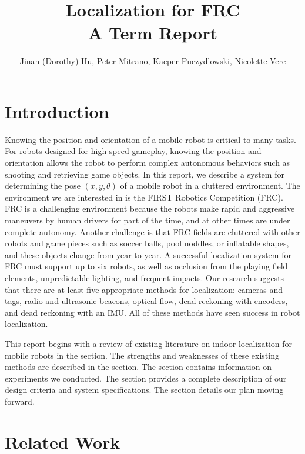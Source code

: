 \documentclass{article}
\begin{document}
\title{Localization for FRC \\
  \large{A Term Report}
  }
\author{Jinan (Dorothy) Hu, Peter Mitrano, Kacper Puczydlowski, Nicolette Vere}

\maketitle{}

\section{Introduction}

  Knowing the position and orientation of a mobile robot is critical to many tasks. For robots designed for high-speed gameplay, knowing the position and orientation allows the robot to perform complex autonomous behaviors such as shooting and retrieving game objects. In this report, we describe a system for determining the pose $(x, y, \theta)$ of a mobile robot in a cluttered environment. The environment we are interested in is the FIRST Robotics Competition (FRC). FRC is a challenging environment because the robots make rapid and aggressive maneuvers by human drivers for part of the time, and at other times are under complete autonomy. Another challenge is that FRC fields are cluttered with other robots and game pieces such as soccer balls, pool noddles, or inflatable shapes, and these objects change from year to year. A successful localization system for FRC must support up to six robots, as well as occlusion from the playing field elements, unpredictable lighting, and frequent impacts. Our research suggests that there are at least five appropriate methods for localization: cameras and tags, radio and ultrasonic beacons, optical flow, dead reckoning with encoders, and dead reckoning with an IMU. All of these methods have seen success in robot localization.

  This report begins with a review of existing literature on indoor localization for mobile robots in the  section. The strengths and weaknesses of these existing methods are described in the  section. The  section contains information on experiments we conducted. The  section provides a complete description of our design criteria and system specifications. The  section details our plan moving forward.

\section{Related Work} \label{related_work}
\end{document}
